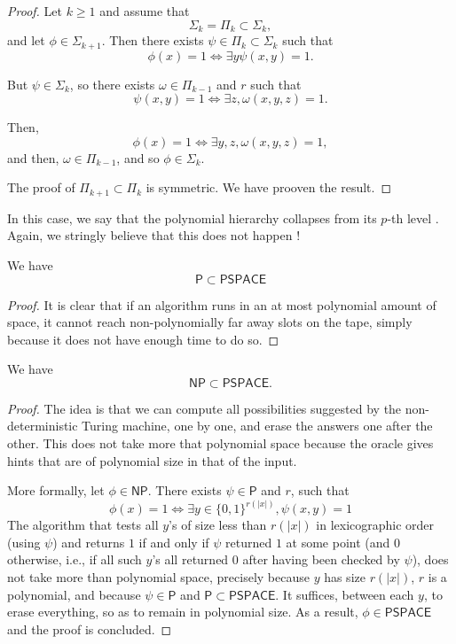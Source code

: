 \begin{proof}
    Let $ k \ge 1 $ and assume that 
    \[
        \mathsf \Sigma_k = \mathsf \Pi_k \subset \mathsf \Sigma_k,
    \]
    and let $ \phi \in \Sigma_{k+1} $. Then there exists $ \psi \in \mathsf \Pi_k \subset \mathsf \Sigma_k $ such that
    \[
        \phi(x) = 1 \iff \exists y \psi(x,y) = 1.
    \]

    But $\psi \in \mathsf \Sigma_k$, so there exists $ \omega \in \mathsf \Pi_{k-1}$ and $r$ such that
    \[
        \psi(x,y) = 1 \iff \exists z, \omega(x,y,z) = 1.
    \]

    Then,
    \[
        \phi(x) = 1 \iff \exists y, z, \omega(x, y, z) = 1,
    \]
    and then, $\omega \in \Pi_{k-1}$, and so $ \phi \in \Sigma_k $.

    The proof of $\mathsf \Pi_{k+1} \subset \mathsf \Pi_k$ is symmetric. We have prooven the result.
\end{proof}

In this case, we say that the polynomial hierarchy \og collapses from its $p$-th level \fg. Again, we stringly believe that this does not happen !

\begin{proposition}
    We have
    \[
        \mathsf{P} \subset \mathsf{PSPACE}
    \]
\end{proposition}

\begin{proof}
    It is clear that if an algorithm runs in an at most polynomial amount of space, it cannot reach non-polynomially far away slots on the tape, simply because it does not have enough time to do so.
\end{proof}

\begin{proposition}
    We have
    \[
        \mathsf{NP} \subset \mathsf{PSPACE}.
    \]
\end{proposition}

\begin{proof}
    The idea is that we can compute all possibilities suggested by the non-deterministic Turing machine, one by one, and erase the answers one after the other. This does not take more that polynomial space because the oracle gives hints that are of polynomial size in that of the input.

    More formally, let $ \phi \in \mathsf{NP} $. There exists $ \psi \in \mathsf P $ and $ r $, such that
    \[
        \phi(x) = 1 \iff \exists y \in \{ 0,1 \}^{r(|x|)}, \psi(x,y) = 1
    \]
    The algorithm that tests all $y$'s of size less than $ r(|x|) $ in lexicographic order (using $ \psi $) and returns $ 1 $ if and only if $ \psi $ returned $ 1 $ at some point (and $ 0 $ otherwise, i.e., if all such $ y $'s all returned $ 0 $ after having been checked by $ \psi $), does not take more than polynomial space, precisely because $ y $ has size $ r(|x|) $, $ r $ is a polynomial, and because $ \psi \in \mathsf P $ and $ \mathsf P \subset \mathsf{PSPACE} $. It suffices, between each $ y $, to erase everything, so as to remain in polynomial size. As a result, $ \phi \in \mathsf{PSPACE} $ and the proof is concluded.
\end{proof}

